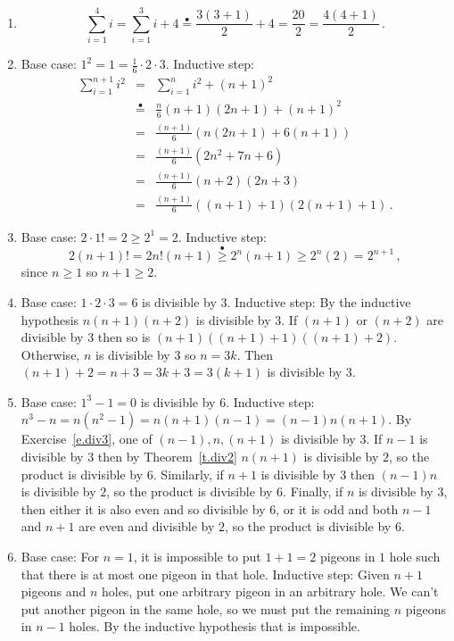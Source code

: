 \documentclass[11pt,a4paper]{report}
\newcommand*{\ih}{\stackrel{\bullet}{=}}
\newcommand*{\ihge}{\stackrel{\bullet}{\geq}}
\begin{document}
\begin{enumerate}
\item 
\[
\sum_{i=1}^4 i = \sum_{i=1}^3 i + 4 \ih{} \frac{3(3+1)}{2} + 4 = \frac{20}{2} = \frac{4(4+1)}{2}\,.
\]

\item Base case: $1^2 = 1 = \frac{1}{6}\cdot 2\cdot 3$. Inductive step:
\begin{eqnarray*}
\sum_{i=1}^{n+1} i^2 &=& \sum_{i=1}^n i^2 + (n+1)^2\\
&\ih{}& \frac{n}{6}(n+1)(2n+1) + (n+1)^2\\
&=& \frac{(n+1)}{6} (n(2n+1) + 6(n+1))\\
&=& \frac{(n+1)}{6}(2n^2+7n+6)\\
&=& \frac{(n+1)}{6}(n+2)(2n+3)\\
&=& \frac{(n+1)}{6}((n+1)+1)(2(n+1)+1)\,.
\end{eqnarray*}

\item Base case: $2\cdot 1! = 2 \geq 2^1 = 2$. Inductive step:
\[
2(n+1)!=2n!(n+1)\ihge{}2^n(n+1) \geq 2^n(2) = 2^{n+1}\,,
\]
since $n\geq 1$ so $n+1 \geq 2$.

\item Base case: $1\cdot 2 \cdot 3 = 6$ is divisible by $3$. Inductive step: By the inductive hypothesis $n(n+1)(n+2)$ is divisible by $3$. If $(n+1)$ or $(n+2)$ are divisible by $3$ then so is $(n+1)((n+1)+1)((n+1)+2)$. Otherwise, $n$ is divisible by $3$ so $n=3k$. Then $(n+1)+2 = n+3=3k+3=3(k+1)$ is divisible by $3$.

\item Base case: $1^3-1=0$ is divisible by $6$. Inductive step: $n^3-n=n(n^2-1)=n(n+1)(n-1)=(n-1)n(n+1)$. By Exercise~\ref{e.div3}, one of $(n-1),n,(n+1)$ is divisible by $3$. If $n-1$ is divisible by $3$ then by Theorem~\ref{t.div2} $n(n+1)$ is divisible by $2$, so the product is divisible by $6$. Similarly, if $n+1$ is divisible by $3$ then $(n-1)n$ is divisible by $2$, so the product is divisible by $6$. Finally, if $n$ is divisible by $3$, then either it is also even and so divisible by $6$, or it is odd and both $n-1$ and $n+1$ are even and divisible by $2$, so the product is divisible by $6$.

\item Base case: For $n=1$, it is impossible to put $1+1=2$ pigeons in $1$ hole such that there is at most one pigeon in that hole. Inductive step: Given $n+1$ pigeons and $n$ holes, put one arbitrary pigeon in an arbitrary hole. We can't put another pigeon in the same hole, so we must put the remaining $n$ pigeons in $n-1$ holes. By the inductive hypothesis that is impossible.


\end{enumerate}
\end{document}

